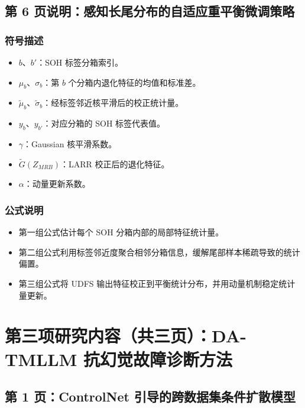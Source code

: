 ﻿\documentclass[UTF8,a4paper,10pt]{ctexart}
\begin{document}
\clearpage
\subsection*{第 6 页说明：感知长尾分布的自适应重平衡微调策略}
\subsubsection*{符号描述}
\begin{itemize}
  \item $b$、$b'$：SOH 标签分箱索引。
  \item $\mu_b$、$\sigma_b$：第 $b$ 个分箱内退化特征的均值和标准差。
  \item $\widetilde\mu_b$、$\widetilde\sigma_b$：经标签邻近核平滑后的校正统计量。
  \item $y_b$、$y_{b'}$：对应分箱的 SOH 标签代表值。
  \item $\gamma$：Gaussian 核平滑系数。
  \item $\widetilde G(Z_{MRB})$：LARR 校正后的退化特征。
  \item $\alpha$：动量更新系数。
\end{itemize}
\subsubsection*{公式说明}
\begin{itemize}
  \item 第一组公式估计每个 SOH 分箱内部的局部特征统计量。
  \item 第二组公式利用标签邻近度聚合相邻分箱信息，缓解尾部样本稀疏导致的统计偏置。
  \item 第三组公式将 UDFS 输出特征校正到平衡统计分布，并用动量机制稳定统计量更新。
\end{itemize}

\clearpage
\section{第三项研究内容（共三页）：DA-TMLLM 抗幻觉故障诊断方法}

\subsection{第 1 页：ControlNet 引导的跨数据集条件扩散模型}
\end{document}
